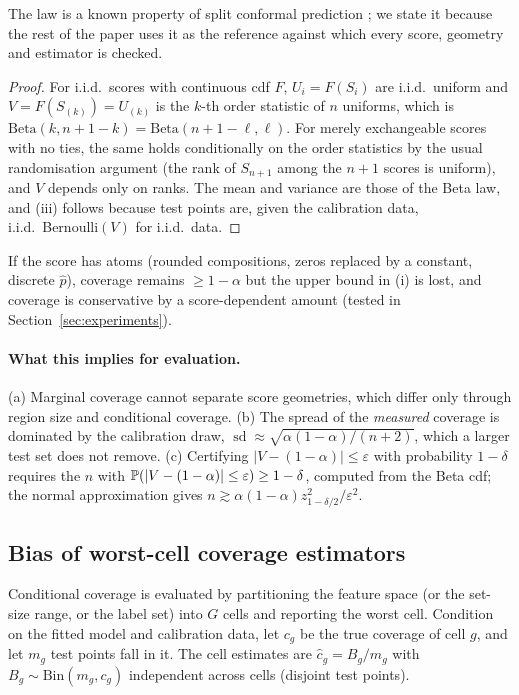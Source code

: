The law is a known property of split conformal prediction \citep{vovk2012conditional,angelopoulos2023gentle}; we state it because the rest of the paper uses it as the reference against which every score, geometry and estimator is checked.

\begin{proof}
For i.i.d.\ scores with continuous cdf $F$, $U_i=F(S_i)$ are i.i.d.\ uniform and $V=F(S_{(k)})=U_{(k)}$ is the $k$-th order statistic of $n$ uniforms, which is $\mathrm{Beta}(k,n+1-k)=\mathrm{Beta}(n+1-\ell,\ell)$.
For merely exchangeable scores with no ties, the same holds conditionally on the order statistics by the usual randomisation argument (the rank of $S_{n+1}$ among the $n+1$ scores is uniform), and $V$ depends only on ranks.
The mean and variance are those of the Beta law, and (iii) follows because test points are, given the calibration data, i.i.d.\ Bernoulli$(V)$ for i.i.d.\ data.
\end{proof}

\begin{remark}[ties]
If the score has atoms (rounded compositions, zeros replaced by a constant, discrete $\hat p$), coverage remains $\ge1-\alpha$ but the upper bound in (i) is lost, and coverage is conservative by a score-dependent amount (tested in Section~\ref{sec:experiments}).
\end{remark}

\paragraph{What this implies for evaluation.}
(a) Marginal coverage cannot separate score geometries, which differ only through region size and conditional coverage.
(b) The spread of the \emph{measured} coverage is dominated by the calibration draw, $\operatorname{sd}\approx\sqrt{\alpha(1-\alpha)/(n+2)}$, which a larger test set does not remove.
(c) Certifying $|V-(1-\alpha)|\le\varepsilon$ with probability $1-\delta$ requires the $n$ with $\mathbb{P}(|V-(1-\alpha)|\le\varepsilon)\ge1-\delta$, computed from the Beta cdf; the normal approximation gives $n\gtrsim\alpha(1-\alpha)z_{1-\delta/2}^2/\varepsilon^2$.

\subsection{Bias of worst-cell coverage estimators}
\label{sec:minbias}
Conditional coverage is evaluated by partitioning the feature space (or the set-size range, or the label set) into $G$ cells and reporting the worst cell.
Condition on the fitted model and calibration data, let $c_g$ be the true coverage of cell $g$, and let $m_g$ test points fall in it.
The cell estimates are $\hat c_g=B_g/m_g$ with $B_g\sim\mathrm{Bin}(m_g,c_g)$ independent across cells (disjoint test points).

